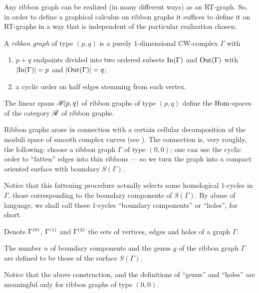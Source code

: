 Any ribbon graph can be realized (in many different ways) as an
RT-graph. So, in order to define a graphical calculus on ribbon graphs
it suffices to define it on RT-graphs in a way that is independent of
the particular realization chosen.

\begin{definition}\label{dfn:ribbon-graphs}
  A \emph{ribbon graph} of type $(p,q)$ is a purely 1-dimensional
  CW-complex $\Gamma$ with 
  \begin{enumerate}
  \item $p+q$ endpoints divided into two ordered subsets $\operatorname{In}(\Gamma)$ and
    $\operatorname{Out}(\Gamma)$ with $\lvert\operatorname{In}(\Gamma)\rvert=p$ and $\lvert\operatorname{Out}(\Gamma)\rvert=q$;
  \item a cyclic order on half edges stemming from each vertex.
  \end{enumerate}
  The linear spans $\mathscr{R}_{}(p,q)$ of ribbon graphs of type $(p,q)$ define the
  $\operatorname{Hom}$-spaces of the category $\mathscr{R}_{}$ of ribbon graphs.
\end{definition}%
%
%
%
%
%

Ribbon graphs arose in connection with a certain cellular
decomposition of the moduli space of smooth complex curves (see
). The connection is, very roughly, the following:
choose a ribbon graph $\Gamma$ of type $(0,0)$; one can use the cyclic
order to ``fatten'' edges into thin ribbons --- so we turn the graph
into a compact oriented surface with boundary $S(\Gamma)$.

Notice that this fattening procedure actually selects some homological
$1$-cycles in $\Gamma$, those corresponding to the boundary components
of $S(\Gamma)$. By abuse of language, we shall call these $1$-cycles
``boundary components'' or ``holes'', for short.

Denote $\Gamma^{(0)}$, $\Gamma^{(1)}$ and $\Gamma^{(2)}$ the
sets of vertices, edges and holes of a graph $\Gamma$.%
%

The number $n$ of boundary components and the genus $g$ of the ribbon
graph $\Gamma$ are defined to be those of the surface $S(\Gamma)$.
\begin{remark}
  Notice that the above construction, and the definitions of ``genus''
  and ``holes'' are meaningful only for ribbon graphs of type $(0,0)$.
\end{remark}


